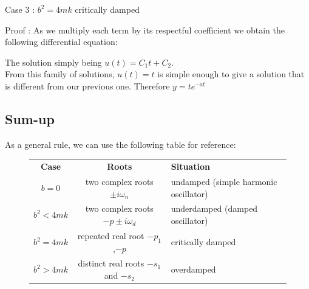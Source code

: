 \documentclass[11pt, openright]{book}
\begin{document}
\begin{dent}{Case 3 : $b^2=4mk$ critically damped}
\begin{dent}{Proof :}
        As we multiply each term by its respectful coefficient we obtain the following differential equation:\\

        The solution simply being $u(t)=C_1t+C_2$.\\
        From this family of solutions, $u(t)=t$ is simple enough to give a solution that is different from our previous one. Therefore $y=te^{-at}$

    \end{dent}

\end{dent}

\subsection{Sum-up}

As a general rule, we can use the following table for reference:\vspace{-10pt}\\
\begin{figure}[ht]
    \renewcommand{\arraystretch}{1.5}
    {\setlength{\tabcolsep}{2em}
        \begin{tabular}{c c l}
            \textbf{Case} & \textbf{Roots}                        & \textbf{Situation}                    \\
            $b=0$         & two complex roots $\pm i\omega_n$     & undamped (simple harmonic oscillator) \\
            $b^2<4mk$     & two complex roots $-p\pm i\omega_d$   & underdamped (damped oscillator)       \\
            $b^2=4mk$     & repeated real root $-p_1$,$-p$        & critically damped                     \\
            $b^2>4mk$     & distinct real roots $-s_1$ and $-s_2$ & overdamped                            \\
        \end{tabular}}
\end{figure}
\end{document}
